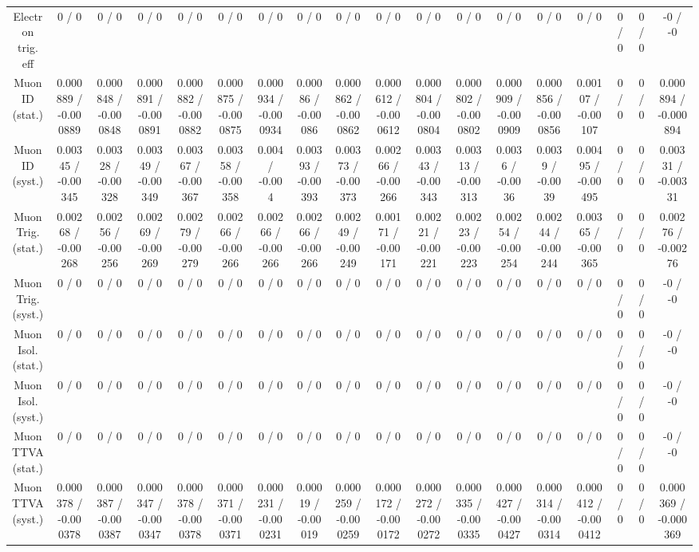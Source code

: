 \documentclass[10pt]{article}
\begin{document}
\begin{table}[htbp]
\begin{center}
\begin{tabular}{|c|c|c|c|c|c|c|c|c|c|c|c|c|c|c|c|c|c|}
  Electron trig. eff & 0 / 0 & 0 / 0 & 0 / 0 & 0 / 0 & 0 / 0 & 0 / 0 & 0 / 0 & 0 / 0 & 0 / 0 & 0 / 0 & 0 / 0 & 0 / 0 & 0 / 0 & 0 / 0 & 0 / 0 & 0 / 0 & -0 / -0 \\ 
  Muon ID (stat.) & 0.000889 / -0.000889 & 0.000848 / -0.000848 & 0.000891 / -0.000891 & 0.000882 / -0.000882 & 0.000875 / -0.000875 & 0.000934 / -0.000934 & 0.00086 / -0.00086 & 0.000862 / -0.000862 & 0.000612 / -0.000612 & 0.000804 / -0.000804 & 0.000802 / -0.000802 & 0.000909 / -0.000909 & 0.000856 / -0.000856 & 0.00107 / -0.00107 & 0 / 0 & 0 / 0 & 0.000894 / -0.000894 \\ 
  Muon ID (syst.) & 0.00345 / -0.00345 & 0.00328 / -0.00328 & 0.00349 / -0.00349 & 0.00367 / -0.00367 & 0.00358 / -0.00358 & 0.004 / -0.004 & 0.00393 / -0.00393 & 0.00373 / -0.00373 & 0.00266 / -0.00266 & 0.00343 / -0.00343 & 0.00313 / -0.00313 & 0.0036 / -0.0036 & 0.0039 / -0.0039 & 0.00495 / -0.00495 & 0 / 0 & 0 / 0 & 0.00331 / -0.00331 \\ 
  Muon Trig. (stat.) & 0.00268 / -0.00268 & 0.00256 / -0.00256 & 0.00269 / -0.00269 & 0.00279 / -0.00279 & 0.00266 / -0.00266 & 0.00266 / -0.00266 & 0.00266 / -0.00266 & 0.00249 / -0.00249 & 0.00171 / -0.00171 & 0.00221 / -0.00221 & 0.00223 / -0.00223 & 0.00254 / -0.00254 & 0.00244 / -0.00244 & 0.00365 / -0.00365 & 0 / 0 & 0 / 0 & 0.00276 / -0.00276 \\ 
  Muon Trig. (syst.) & 0 / 0 & 0 / 0 & 0 / 0 & 0 / 0 & 0 / 0 & 0 / 0 & 0 / 0 & 0 / 0 & 0 / 0 & 0 / 0 & 0 / 0 & 0 / 0 & 0 / 0 & 0 / 0 & 0 / 0 & 0 / 0 & -0 / -0 \\ 
  Muon Isol. (stat.) & 0 / 0 & 0 / 0 & 0 / 0 & 0 / 0 & 0 / 0 & 0 / 0 & 0 / 0 & 0 / 0 & 0 / 0 & 0 / 0 & 0 / 0 & 0 / 0 & 0 / 0 & 0 / 0 & 0 / 0 & 0 / 0 & -0 / -0 \\ 
  Muon Isol. (syst.) & 0 / 0 & 0 / 0 & 0 / 0 & 0 / 0 & 0 / 0 & 0 / 0 & 0 / 0 & 0 / 0 & 0 / 0 & 0 / 0 & 0 / 0 & 0 / 0 & 0 / 0 & 0 / 0 & 0 / 0 & 0 / 0 & -0 / -0 \\ 
  Muon TTVA (stat.) & 0 / 0 & 0 / 0 & 0 / 0 & 0 / 0 & 0 / 0 & 0 / 0 & 0 / 0 & 0 / 0 & 0 / 0 & 0 / 0 & 0 / 0 & 0 / 0 & 0 / 0 & 0 / 0 & 0 / 0 & 0 / 0 & -0 / -0 \\ 
  Muon TTVA (syst.) & 0.000378 / -0.000378 & 0.000387 / -0.000387 & 0.000347 / -0.000347 & 0.000378 / -0.000378 & 0.000371 / -0.000371 & 0.000231 / -0.000231 & 0.00019 / -0.00019 & 0.000259 / -0.000259 & 0.000172 / -0.000172 & 0.000272 / -0.000272 & 0.000335 / -0.000335 & 0.000427 / -0.000427 & 0.000314 / -0.000314 & 0.000412 / -0.000412 & 0 / 0 & 0 / 0 & 0.000369 / -0.000369 \\ 

\end{tabular}
\end{center}
\end{table}
\end{document}
